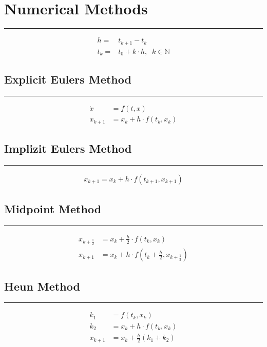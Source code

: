 \section{Numerical Methods}
\noindent\rule[\linienAbstand]{\linewidth}{\linienDickeDick}
\begin{equation}
  \begin{split}
    h =& t_{k+1} - t_k\\
    t_k =& t_0 + k \cdot h, \;\; k \in \mathbb{N}
  \end{split}
\end{equation}

\subsection{Explicit Eulers Method}
\noindent\rule[\linienAbstand]{\linewidth}{\linienDicke}
\begin{equation}
  \begin{split}
    \dot{x} &= f(t, x)\\
    x_{k+1} &= x_k + h \cdot f(t_k, x_k)
  \end{split}
\end{equation}

\subsection{Implizit Eulers Method}
\noindent\rule[\linienAbstand]{\linewidth}{\linienDicke}
\begin{equation}
  \begin{split}
    x_{k+1} = x_k + h \cdot f(t_{k+1}, x_{k+1})
  \end{split}
\end{equation}

\subsection{Midpoint Method}
\noindent\rule[\linienAbstand]{\linewidth}{\linienDicke}
\begin{equation}
  \begin{split}
    x_{k+\frac{1}{2}} &= x_k + \frac{h}{2} \cdot f(t_k, x_k)\\
    x_{k+1}           &= x_k + h \cdot f(t_{k} + \frac{h}{2}, x_{k+\frac{1}{2}})
  \end{split}
\end{equation}

\subsection{Heun Method}
\noindent\rule[\linienAbstand]{\linewidth}{\linienDicke}
\begin{equation}
  \begin{split}
    k_1 &= f(t_k, x_k)\\
    k_2 &= x_k + h \cdot f(t_k, x_k)\\
    x_{k+1} &= x_k + \frac{h}{2}(k_1 + k_2)
  \end{split}
\end{equation}

